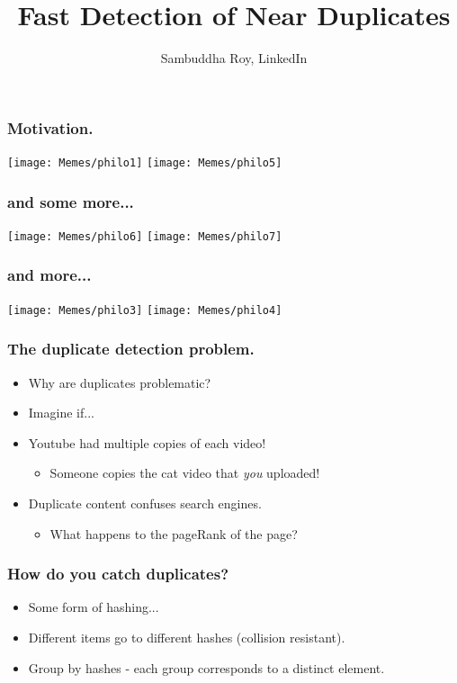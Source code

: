 \documentclass{beamer}
\title[CODS, Mar. 16, 2016] %
{Fast Detection of Near Duplicates}
\author{Sambuddha Roy, LinkedIn}
\begin{document}
\begin{frame}
  \titlepage
\end{frame}

\begin{frame}
\frametitle{Motivation.}
\begin{center}
\texttt{[image: Memes/philo1]}
\texttt{[image: Memes/philo5]}
\end{center}
\end{frame}

\begin{frame}
\frametitle{and some more...}
\begin{center}
\texttt{[image: Memes/philo6]}
\texttt{[image: Memes/philo7]}
\end{center}
\end{frame}

\begin{frame}
\frametitle{and more...}
\begin{center}
\texttt{[image: Memes/philo3]}
\texttt{[image: Memes/philo4]}
\end{center}
\end{frame}


\begin{frame}
\frametitle{The duplicate detection problem.}
\begin{itemize}
\item Why are duplicates problematic? 
\pause
\item Imagine if...
\pause
\item Youtube had multiple copies of each video!
\begin{itemize}
\item Someone copies the cat video that \textit{you} uploaded!
\end{itemize}
\pause
\item Duplicate content confuses search engines.
\begin{itemize}
\item What happens to the pageRank of the page?
\end{itemize}
\end{itemize}
\end{frame}

\begin{frame}
\frametitle{How do you catch duplicates?}
\begin{itemize}
\item Some form of hashing...
\item Different items go to different hashes (collision resistant).
\item Group by hashes - each group corresponds to a distinct element.
\end{itemize}
\end{frame}
\end{document}
